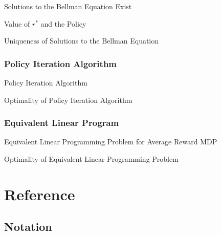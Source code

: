 \documentclass[11pt,a4paper]{article}
\begin{document}
  \begin{theorem}{Solutions to the Bellman Equation Exist}

  \end{theorem}

  \begin{theorem}{Value of $r^*$ and the Policy}

  \end{theorem}

  \begin{theorem}{Uniqueness of Solutions to the Bellman Equation}

  \end{theorem}

\subsubsection{Policy Iteration Algorithm} %

  \begin{definition}{Policy Iteration Algorithm}

  \end{definition}

  \begin{theorem}{Optimality of Policy Iteration Algorithm}

  \end{theorem}

\subsubsection{Equivalent Linear Program} %

\begin{proposition}{Equivalent Linear Programming Problem for Average Reward MDP}

\end{proposition}

\begin{theorem}{Optimality of Equivalent Linear Programming Problem}

\end{theorem}

\newpage
\setcounter{section}{-1}
\section{Reference}

\subsection{Notation}
\end{document}
